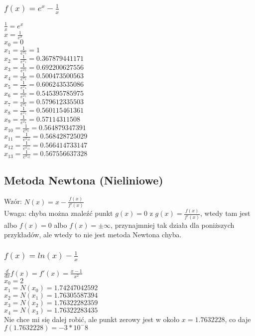 \documentclass{article}
\begin{document}
\subsubsection{$f(x)=e^x-\frac{1}{x}$}
$\frac{1}{x}=e^x$\\
$x=\frac{1}{e^x}$\\
$x_0=0$\\
$x_1=\frac{1}{e^{x_0}}=1$\\
$x_2=\frac{1}{e^{x_1}}=0.367879441171$\\
$x_3=\frac{1}{e^{x_2}}=0.692200627556$\\
$x_4=\frac{1}{e^{x_3}}=0.500473500563$\\
$x_5=\frac{1}{e^{x_4}}=0.606243535086$\\
$x_6=\frac{1}{e^{x_5}}=0.545395785975$\\
$x_7=\frac{1}{e^{x_6}}=0.579612335503$\\
$x_8=\frac{1}{e^{x_7}}=0.560115461361$\\
$x_9=\frac{1}{e^{x_8}}=0.57114311508$\\
$x_{10}=\frac{1}{e^{x_9}}=0.564879347391$\\
$x_{11}=\frac{1}{e^{x_{10}}}=0.568428725029$\\
$x_{12}=\frac{1}{e^{x_{11}}}=0.566414733147$\\
$x_{13}=\frac{1}{e^{x_{12}}}=0.567556637328$\\

\subsection{Metoda Newtona (Nieliniowe)}
Wzór: $N(x)=x-\frac{f(x)}{f'(x)}$\\
Uwaga: chyba można znaleźć punkt $g(x)=0$ z $g(x)=\frac{f(x)}{f'(x)}$, wtedy tam jest albo $f(x)=0$ albo $f(x)=\pm \infty$, przynajmniej tak działa dla poniższych przykładów, ale wtedy to nie jest metoda Newtona chyba.
\subsubsection{$f(x)=ln(x)-\frac{1}{x}$}
$\frac{d}{dx}f(x)=f'(x)=\frac{x-1}{x^2}$\\
$x_0=2$\\
$x_1=N(x_0)=1.74247042592$\\
$x_2=N(x_1)=1.76305587394$\\
$x_3=N(x_2)=1.76322282359$\\
$x_4=N(x_3)=1.76322283435$\\
Nie chce mi się dalej robić, ale punkt zerowy jest w około $x=1.7632228$, co daje $f(1.7632228)=-3*10^-8$\\
\end{document}
